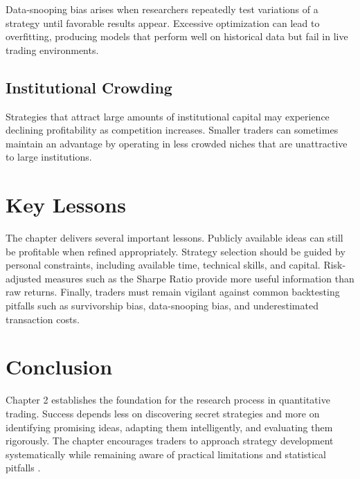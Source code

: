 \documentclass[11pt]{article}
\begin{document}
Data-snooping bias arises when researchers repeatedly test variations of a strategy until favorable results appear. Excessive optimization can lead to overfitting, producing models that perform well on historical data but fail in live trading environments.

\subsection{Institutional Crowding}

Strategies that attract large amounts of institutional capital may experience declining profitability as competition increases. Smaller traders can sometimes maintain an advantage by operating in less crowded niches that are unattractive to large institutions.

\section{Key Lessons}

The chapter delivers several important lessons. Publicly available ideas can still be profitable when refined appropriately. Strategy selection should be guided by personal constraints, including available time, technical skills, and capital. Risk-adjusted measures such as the Sharpe Ratio provide more useful information than raw returns. Finally, traders must remain vigilant against common backtesting pitfalls such as survivorship bias, data-snooping bias, and underestimated transaction costs.

\section{Conclusion}

Chapter 2 establishes the foundation for the research process in quantitative trading. Success depends less on discovering secret strategies and more on identifying promising ideas, adapting them intelligently, and evaluating them rigorously. The chapter encourages traders to approach strategy development systematically while remaining aware of practical limitations and statistical pitfalls \cite{chan2021}.



\end{document}
